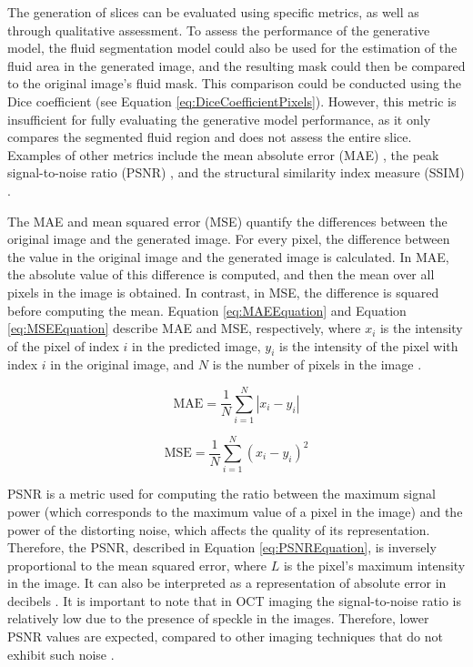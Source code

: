 The generation of slices can be evaluated using specific metrics, as well as through qualitative assessment. To assess the performance of the generative model, the fluid segmentation model could also be used for the estimation of the fluid area in the generated image, and the resulting mask could then be compared to the original image's fluid mask. This comparison could be conducted using the Dice coefficient \parencite{Lopez2023} (see Equation \ref{eq:DiceCoefficientPixels}). However, this metric is insufficient for fully evaluating the generative model performance, as it only compares the segmented fluid region and does not assess the entire slice. Examples of other metrics include the mean absolute error (MAE) \parencite{Lopez2023, Wu2022, Zhang2022}, the peak signal-to-noise ratio (PSNR) \parencite{Xia2021, YChen2018, Sanchez2018, Fang2022, Nimitha2024, Kudo2019, You2020, Zhang2024, Zhang2022}, and the structural similarity index measure (SSIM) \parencite{YChen2018, Sanchez2018, Fang2022, Nimitha2024, Kudo2019, You2020, Zhang2024, Zhang2022}.
\par
The MAE and mean squared error (MSE) quantify the differences between the original image and the generated image. For every pixel, the difference between the value in the original image and the generated image is calculated. In MAE, the absolute value of this difference is computed, and then the mean over all pixels in the image is obtained. In contrast, in MSE, the difference is squared before computing the mean. Equation \ref{eq:MAEEquation} and Equation \ref{eq:MSEEquation} describe MAE and MSE, respectively, where $x_{i}$ is the intensity of the pixel of index $i$ in the predicted image, $y_{i}$ is the intensity of the pixel with index $i$ in the original image, and $N$ is the number of pixels in the image \parencite{Sara2019, Rajkumar2016}.

\begin{equation}
	\text{MAE} = \frac{1}{N} \sum_{i=1}^{N} |x_i - y_i|
	\label{eq:MAEEquation}
\end{equation}

\begin{equation}
	\text{MSE} = \frac{1}{N} \sum_{i=1}^{N} \left( x_i - y_i \right)^{2}
	\label{eq:MSEEquation}
\end{equation}

PSNR is a metric used for computing the ratio between the maximum signal power (which corresponds to the maximum value of a pixel in the image) and the power of the distorting noise, which affects the quality of its representation. Therefore, the PSNR, described in Equation \ref{eq:PSNREquation}, is inversely proportional to the mean squared error, where $L$ is the pixel's maximum intensity in the image. It can also be interpreted as a representation of absolute error in decibels \parencite{Sara2019}. It is important to note that in OCT imaging the signal-to-noise ratio is relatively low due to the presence of speckle in the images. Therefore, lower PSNR values are expected, compared to other imaging techniques that do not exhibit such noise \parencite{Bogunovic2019a}.

